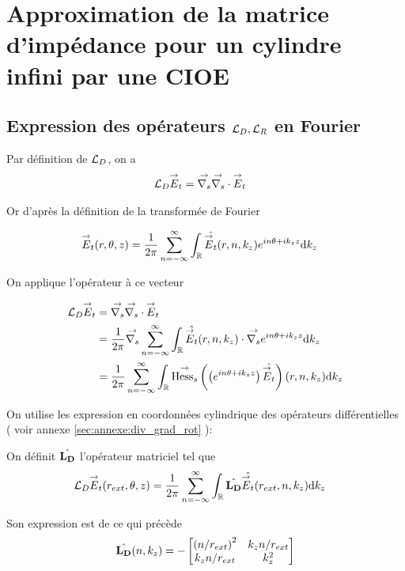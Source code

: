 \section{Approximation de la matrice d'impédance pour un cylindre infini par une CIOE}

  \subsection[Expression des opérateurs LD,LR en Fourier]{Expression des opérateurs \({\mathcal{L}_D},{\mathcal{L}_R}\) en Fourier}

    Par définition de \({\mathcal{L}_D}\), on a
    \begin{align}
      {\mathcal{L}_D} {\overset{\rightarrow}{E}}_t & = {\overset{\rightarrow}{\nabla_s}}{} {\overset{\rightarrow}{\nabla_s}} \cdot{} {\overset{\rightarrow}{E}}_t
    \end{align}

    Or d’après la définition de la transformée de Fourier

    \begin{align}
      {\overset{\rightarrow}{E}}_t(r,\theta,z) & = \dfrac{1}{2\pi}\sum_{n=-\infty}^\infty \int_\mathbb R \hat{{\overset{\rightarrow}{E}}_t}(r,n,k_z)e^{in\theta + ik_zz}\mathrm{d}{k_z}
    \end{align}

    On applique l'opérateur à ce vecteur

    \begin{align}
      {\mathcal{L}_D} {\overset{\rightarrow}{E}}_t
      & = {\overset{\rightarrow}{\nabla_s}}{} {\overset{\rightarrow}{\nabla_s}} \cdot{} {\overset{\rightarrow}{E}}_t
      \\
      &=\dfrac{1}{2\pi}{\overset{\rightarrow}{\nabla_s}}{} \sum_{n=-\infty}^\infty\int_\mathbb R \hat{{\overset{\rightarrow}{E}}_t}(r,n,k_z) \cdot {\overset{\rightarrow}{\nabla_s}}{} e^{in\theta + ik_zz}\mathrm{d}{k_z}
      \\
      &=\dfrac{1}{2\pi}\sum_{n=-\infty}^\infty \int_\mathbb R {\overset{\rightarrow}{\operatorname{Hess}_s}}{}\left(\left( e^{in\theta + ik_zz} \right) \hat{{\overset{\rightarrow}{E}}_t}\right)(r,n,k_z)\mathrm{d}{k_z}
    \end{align}

    On utilise les expression en coordonnées cylindrique des opérateurs différentielles ( voir annexe \ref{sec:annexe:div_grad_rot} ):

    On définit \(\hat{\mathbf{L_D}}\) l'opérateur matriciel tel que
    \begin{align}
      {\mathcal{L}_D} {\overset{\rightarrow}{E}}_t (r_{ext},\theta,z)
      &= \dfrac{1}{2\pi}\sum_{n=-\infty}^\infty\int_\mathbb R \hat{\mathbf{L_D}} \hat{{\overset{\rightarrow}{E}}_t}(r_{ext},n,k_z)\mathrm{d}{k_z}
    \end{align}

    Son expression est de ce qui précède
    \begin{equation}
      \label{eq:cylindre:fourier:LD}
      \hat{\mathbf{L_D}}(n,k_z) = -
      \begin{bmatrix}
        \left({n}\slash{r_{ext}}\right)^2 & k_z{n}\slash{r_{ext}}
        \\
        k_z{n}\slash{r_{ext}} & k_z^2
      \end{bmatrix}
    \end{equation}

